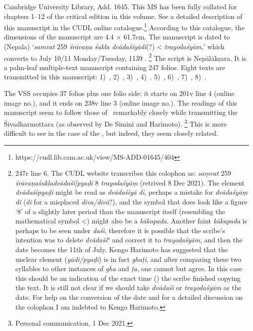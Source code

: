 Cambridge University Library, Add. 1645. This MS has been fully
collated for chapters 1--12 of the critical edition in this volume. 
See a detailed description of this manuscript in the CUDL online catalogue.\footnote{https://cudl.lib.cam.ac.uk/view/MS-ADD-01645/404}
According to this catalogue, the dimensions of the manuscript are 
4.4 × 61.7cm. The manuscript is dated to (Nepala) `\emph{samvat} 259
\emph{śrāvaṇa śukla dvādaśiyādi}(?) \textless{} \emph{trayodaśyām},'
which converts to July 10/11 Monday/Tuesday, 1139 \CE.%
		 \footnote{\Fol247r line 6. The CUDL website transcribes this
		  colophon as: \emph{saṃvat} 259 
		  \emph{śrāvaṇaśukladvādaśi{\rm[}pyaḍi} 8 
		  \emph{trayodaśyāṃ} (retrived 8 Dec 2021). 
		  The element \emph{dvādaśipyaḍi} might be read as
		  \emph{dvādaśiyā} \emph{di}, perhaps a mistake for
		   \emph{dvādaśyāṃ}
		  \emph{di} (\emph{di} for a misplaced \emph{diva/divā}?), and the
		  symbol that does look like a figure `8' of a slightly later period
		  than the manuscript itself (resembling the mathematical symbol
		  \textless{}) might also be a \emph{kākapada}. Another faint
		  \emph{kākapada} is perhaps to be seen under \emph{daśi},
		  therefore it is possible that the scribe's intention was to delete 	
		  \emph{dvādaśi}° and correct it to \emph{trayodaśyām}, 
		  and then the date becomes the 11th of July. Kengo Harimoto 
		  has suggested that the unclear element
		  (\emph{yādi/pyaḍi}) is in fact \emph{ghaṭi}, 
		  and after comparing these two syllables to other instances of
		   \emph{gha} and \emph{ṭa}, one cannot but agree. 
		   In this case this should be an indication of the
		  exact time () 
		  the scribe finished copying the text. It is still not clear
		  if we should take \emph{dvādaśi} or \emph{trayodaśyām} 
		  as the date. For help on the conversion of the date and 
		  for a detailed discussion on the colophon I am indebted
		  to Kengo Harimoto.} 
The script is Nepālā\-kṣara. It is a palm-leaf multiple-text manuscript containing 247 folios. Eight texts are transmitted in this manuscript: 
1)~,
2)~, 
3)~, 
4)~.
5)~, 
6)~\Uums, 
7)~,
8)~.


The VSS occupies 37 folios plus one folio side: it starts on \fol201v
line 4 (online image no.), 
and it ends on \fol238v line 3 (online image
no.). 
The readings of this manuscript seem to follow those of \msNa\
remarkably closely while transmitting the 
Śivadharmottara (as observed by De Simini and Harimoto).%
\footnote{Personal communication, 1 Dec 2021.} This
is more difficult to see in the case of the \VSS, 
but indeed, they seem closely related. 


